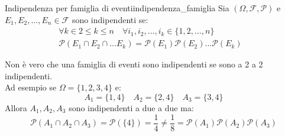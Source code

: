\documentclass[12pt]{report}
\newcounter{definition}
\newcommand{\nmu}{}
\begin{document}
	\begin{definition}{\nmu Indipendenza per famiglia di eventi}{indipendenza_famiglia}
		Sia $(\Omega, \mathcal{F}, \mathcal{P})$ e $E_1, E_2, \dots, E_n \in \mathcal{F}$ sono indipendenti se:
		\begin{align*}
		\forall k \in 2 \leq k \leq n \quad \forall i_1, i_2, \dots, i_k \in \{1, 2, \dots, n\} & \\ \mathcal{P}(E_1 \cap E_2 \cap \dots E_k) = \mathcal{P}(E_1)\mathcal{P}(E_2) \dots \mathcal{P}(E_k)
		\end{align*}
	\end{definition}
	\begin{note}{}{}
		Non è vero che una famiglia di eventi sono indipendenti se sono a 2 a 2 indipendenti. \\
		Ad esempio se $\Omega = \{1, 2, 3, 4\}$ e:
		\[
		A_1 = \{1, 4\} \quad A_2 = \{2, 4\} \quad A_3 = \{3, 4\}
		\]
		Allora $A_1, A_2, A_3$ sono indipendenti a due a due ma:
		\[
		\mathcal{P}(A_1 \cap A_2 \cap A_3) = \mathcal{P}(\{4\}) = \frac{1}{4} \neq \frac{1}{8} = \mathcal{P}(A_1)\mathcal{P}(A_2)\mathcal{P}(A_3)
		\]
	\end{note}
\end{document}
